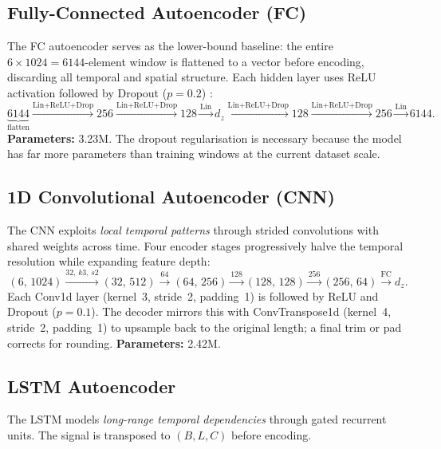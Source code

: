 \documentclass{article}
\begin{document}
\subsection{Fully-Connected Autoencoder (FC)}
\label{sec:fc}

The FC autoencoder serves as the lower-bound baseline: the entire
$6 \times 1024 = 6144$-element window is flattened to a vector before
encoding, discarding all temporal and spatial structure.
Each hidden layer uses ReLU activation followed by Dropout ($p=0.2$)
\citep{srivastava2014dropout}:
%
\begin{equation*}
  \underbrace{6144}_{\text{flatten}} \xrightarrow{\text{Lin+ReLU+Drop}} 256
  \xrightarrow{\text{Lin+ReLU+Drop}} 128
  \xrightarrow{\text{Lin}} d_z
  \xrightarrow{\text{Lin+ReLU+Drop}} 128
  \xrightarrow{\text{Lin+ReLU+Drop}} 256
  \xrightarrow{\text{Lin}} 6144.
\end{equation*}
%
\textbf{Parameters:} 3.23M.
The dropout regularisation is necessary because the model has far more
parameters than training windows at the current dataset scale.

\subsection{1D Convolutional Autoencoder (CNN)}
\label{sec:cnn}

The CNN exploits \emph{local temporal patterns} through strided convolutions
with shared weights across time.
Four encoder stages progressively halve the temporal resolution while
expanding feature depth:
%
\begin{equation*}
  (6,\,1024) \xrightarrow{32,\,k3,\,s2} (32,\,512) \xrightarrow{64}
  (64,\,256) \xrightarrow{128} (128,\,128) \xrightarrow{256}
  (256,\,64) \xrightarrow{\text{FC}} d_z.
\end{equation*}
%
Each Conv1d layer (kernel~3, stride~2, padding~1) is followed by ReLU and
Dropout ($p=0.1$).
The decoder mirrors this with ConvTranspose1d (kernel~4, stride~2, padding~1)
to upsample back to the original length; a final trim or pad corrects for
rounding.
\textbf{Parameters:} 2.42M.

\subsection{LSTM Autoencoder}
\label{sec:lstm}

The LSTM \citep{hochreiter1997long} models \emph{long-range temporal
dependencies} through gated recurrent units.
The signal is transposed to $(B, L, C)$ before encoding.
\end{document}

